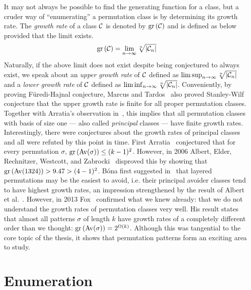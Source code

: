 \documentclass[12pt, a4paper, twoside]{report}
\begin{document}
It may not always be possible to find the generating function for a class, but a cruder way of ``enumerating'' a permutation class is by determining its growth rate. The \emph{growth rate} of a class $\mathcal{C}$ is denoted by $\mathrm{gr}\left(\mathcal{C}\right)$ and is defined as below provided that the limit exists.
$$\mathrm{gr}\left(\mathcal{C}\right) = \lim_{n\to\infty}\sqrt[n]{|\mathcal{C}_n|}$$
Naturally, if the above limit does not exist despite being conjectured to always exist, we speak about an \emph{upper growth rate} of $\mathcal{C}$ defined as $\lim\sup_{n\to\infty}\sqrt[n]{|\mathcal{C}_n|}$ and a \emph{lower growth rate} of $\mathcal{C}$ defined as $\lim\inf_{n\to\infty}\sqrt[n]{|\mathcal{C}_n|}$. Conveniently, by proving F\"{u}redi-Hajnal conjecture, Marcus and Tardos~\cite{marcus04growthrate} also proved Stanley-Wilf conjecture that the upper growth rate is finite for all proper permutation classes. Together with Arratia's observation in~\cite{arratia1999}, this implies that all permutation classes with basis of size one --- also called \emph{principal} classes --- have finite growth rates. Interestingly, there were conjectures about the growth rates of principal classes and all were refuted by this point in time. First Arratia~\cite{arratia1999} conjectured that for every permutation $\sigma$, $\mathrm{gr}\left(\mathrm{Av}(\sigma)\right) \leq (k-1)^2$. However, in 2006 Albert, Elder, Rechnitzer, Westcott, and Zabrocki~\cite{albert2006wilf} disproved this by showing that $\mathrm{gr}\left(\mathrm{Av}(1324)\right) > 9.47 > (4-1)^2$. B\'ona first suggested in~\cite{bona2005wilf} that layered permutations may be the easiest to avoid, i.e. their principal avoider classes tend to have highest growth rates, an impression strengthened by the result of Albert et al.~\cite{albert2006wilf}. However, in 2013 Fox~\cite{fox2013wilf} confirmed what we knew already: that we do not understand the growth rates of permutation classes very well. His result states that almost all patterns $\sigma$ of length $k$ have growth rates of a completely different order than we thought: $\mathrm{gr}\left(\mathrm{Av}(\sigma)\right) = 2^{\Omega(k)}$. Although this was tangential to the core topic of the thesis, it shows that permutation patterns form an exciting area to study.


\part{Enumeration} %
\label{part:enumeration}
%
\end{document}
